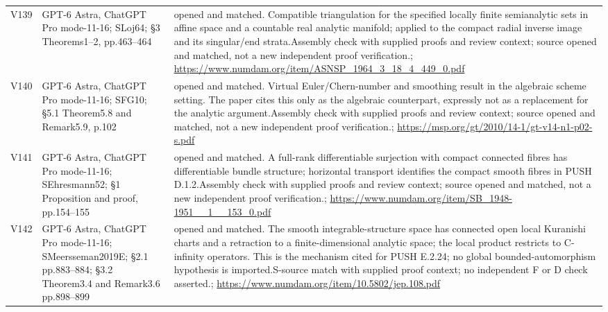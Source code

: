 \begin{longtable}{@{}L{.08\linewidth}L{.31\linewidth}L{.56\linewidth}@{}}
V139 & GPT-6 Astra, ChatGPT Pro mode-11-16; S\newline Loj64; §3 Theorems1--2, pp.463--464 & opened and matched. Compatible triangulation for the specified locally finite semianalytic sets in affine space and a countable real analytic manifold; applied to the compact radial inverse image and its singular/\allowbreak{}end strata.\newline Assembly check with supplied proofs and review context; source opened and matched, not a new independent proof verification.\newline {}; \url{https://www.numdam.org/item/ASNSP_1964_3_18_4_449_0.pdf}\\
V140 & GPT-6 Astra, ChatGPT Pro mode-11-16; S\newline FG10; §5.1 Theorem5.8 and Remark5.9, p.102 & opened and matched. Virtual Euler/\allowbreak{}Chern-number and smoothing result in the algebraic scheme setting. The paper cites this only as the algebraic counterpart, expressly not as a replacement for the analytic argument.\newline Assembly check with supplied proofs and review context; source opened and matched, not a new independent proof verification.\newline {}; \url{https://msp.org/gt/2010/14-1/gt-v14-n1-p02-s.pdf}\\
V141 & GPT-6 Astra, ChatGPT Pro mode-11-16; S\newline Ehresmann52; §1 Proposition and proof, pp.154--155 & opened and matched. A full-rank differentiable surjection with compact connected fibres has differentiable bundle structure; horizontal transport identifies the compact smooth fibres in PUSH D.1.2.\newline Assembly check with supplied proofs and review context; source opened and matched, not a new independent proof verification.\newline {}; \url{https://www.numdam.org/item/SB_1948-1951__1__153_0.pdf}\\
V142 & GPT-6 Astra, ChatGPT Pro mode-11-16; S\newline Meersseman2019E; §2.1 pp.883--884; §3.2 Theorem3.4 and Remark3.6 pp.898--899 & opened and matched. The smooth integrable-structure space has connected open local Kuranishi charts and a retraction to a finite-dimensional analytic space; the local product restricts to C-infinity operators. This is the mechanism cited for PUSH E.2.24; no global bounded-automorphism hypothesis is imported.\newline S-source match with supplied proof context; no independent F or D check asserted.\newline {}; \url{https://www.numdam.org/item/10.5802/jep.108.pdf}\\
\bottomrule\end{longtable}\endgroup
